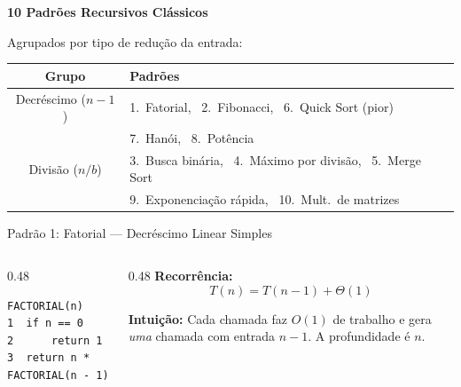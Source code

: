 \documentclass[aspectratio=169]{beamer}
\begin{document}

\begin{frame}{}
    \begin{center}
        {\Large \textbf{10 Padrões Recursivos Clássicos}}
        
        \vspace{0.4cm}
        Agrupados por tipo de redução da entrada:
        
        \vspace{0.3cm}
        \renewcommand{\arraystretch}{1.3}
        \begin{tabular}{cl}
            \toprule
            \textbf{Grupo} & \textbf{Padrões} \\
            \midrule
            Decréscimo ($n-1$) & 1.\ Fatorial, \ 2.\ Fibonacci, \ 6.\ Quick Sort (pior) \\
            & 7.\ Hanói, \ 8.\ Potência \\
            Divisão ($n/b$) & 3.\ Busca binária, \ 4.\ Máximo por divisão, \ 5.\ Merge Sort \\
            & 9.\ Exponenciação rápida, \ 10.\ Mult.\ de matrizes \\
            \bottomrule
        \end{tabular}
    \end{center}
\end{frame}


\begin{frame}{Padrão 1: Fatorial --- Decréscimo Linear Simples}
    \begin{columns}[T]
    \begin{column}{0.48\textwidth}
\begin{verbatim}
FACTORIAL(n)
1  if n == 0
2      return 1
3  return n * FACTORIAL(n - 1)
\end{verbatim}
    \end{column}
    \begin{column}{0.48\textwidth}
        \textbf{Recorrência:}
        \[
            T(n) = T(n-1) + \Theta(1)
        \]
        
        \textbf{Intuição:} Cada chamada faz $O(1)$ de trabalho e gera \emph{uma} chamada com entrada $n{-}1$. A profundidade é $n$.
    \end{column}
    \end{columns}
    
    \vspace{0.3cm}
    \hfill{}
\end{frame}
\end{document}
